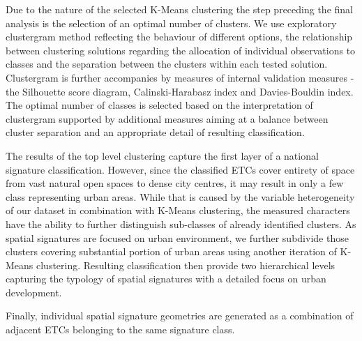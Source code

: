 Due to the nature of the selected K-Means clustering the step preceding the final
analysis is the selection of an optimal number of clusters. We use exploratory
clustergram method\cite{schonlau2002clustergram} reflecting the behaviour of different options, the relationship
between clustering solutions regarding the allocation of individual observations to
classes and the separation between the clusters within each tested solution.
Clustergram is further accompanies by measures of internal validation measures - the
Silhouette score diagram, Calinski-Harabasz index\cite{calinski1974} and Davies-Bouldin index\cite{davies1979cluster}. The optimal
number of classes is selected based on the interpretation of clustergram supported by
additional measures aiming at a balance between cluster separation and an appropriate
detail of resulting classification.

The results of the top level clustering capture the first layer of a national signature
classification. However, since the classified ETCs cover entirety of space from vast
natural open spaces to dense city centres, it may result in only a few class
representing urban areas. While that is caused by the variable heterogeneity of our
dataset in combination with K-Means clustering, the measured characters have the ability
to further distinguish sub-classes of already identified clusters. As spatial signatures
are focused on urban environment, we further subdivide those clusters covering
substantial portion of urban areas using another iteration of K-Means clustering.
Resulting classification then provide two hierarchical levels capturing the typology of
spatial signatures with a detailed focus on urban development.


Finally, individual spatial signature geometries are generated as a combination of
adjacent ETCs belonging to the same signature class.

